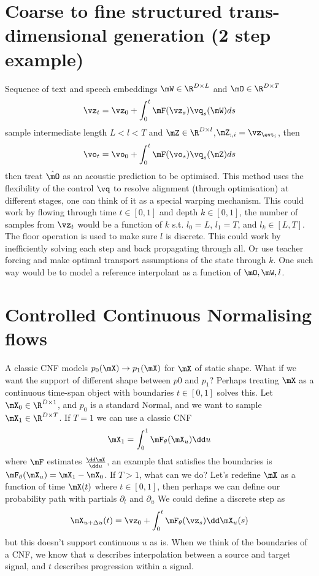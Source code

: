 \section{Coarse to fine structured trans-dimensional generation (2 step example)}
Sequence of text and speech embeddings $\mW\in\R^{D\times L}$ and $\mO\in\R^{D\times T}$
\[
\vz_t=\vz_0 + \int_0^t \mF(\vz_s)\vq_s(\mW)ds
\]
sample intermediate length $L < l < T$ and $\mZ\in\R^{D\times l}$,$\mZ_{:,i}=\vz_{\evt_i}$, then 
\[
\vo_t=\vo_0 + \int_0^t \mF(\vo_s)\vq_s(\mZ)ds
\]
then treat $\hat\mO$ as an acoustic prediction to be optimised. This method uses the flexibility of the control $\vq$ to resolve alignment (through optimisation) at different stages, one can think of it as a special warping mechanism. This could work by flowing through time $t\in[0,1]$ and depth $k\in[0,1]$, the number of samples from $\vz_t$ would be a function of $k$ s.t. $l_0=L$, $l_1=T$, and $l_k\in[L,T]$. The floor operation is used to make sure $l$ is discrete. This could work by inefficiently solving each step and back propagating through all. Or use teacher forcing and make optimal transport assumptions of the state through $k$. One such way would be to model a reference interpolant as a function of $\mO,\mW,l$. 

\section{Controlled Continuous Normalising flows}
A classic CNF models $p_0(\mX)\rightarrow p_1(\mX)$ for $\mX$ of static shape. What if we want the support of different shape between $p0$ and $p_1$? Perhaps treating $\mX$ as a continuous time-span object with boundaries $t\in[0,1]$ solves this.
Let $\mX_0\in\R^{D\times 1}$, and $p_0$ is a standard Normal, and we want to sample $\mX_1\in\R^{D\times T}$. If $T=1$ we can use a classic CNF
\[
\mX_1 = \int_0^1\mF_\theta(\mX_u)\dd u
\]
where $\mF$ estimates $\frac{\dd \mX}{\dd u}$, an example that satisfies the boundaries is $\mF_\theta(\mX_u)=\mX_1-\mX_0$. If $T>1$, what can we do? Let's redefine $\mX$ as a function of time $\mX(t)$ where $t\in[0,1]$, then perhaps we can define our probability path with partials $\partial_t$ and $\partial_u$
We could define a discrete step as
\[
\mX_{u+\Delta u}(t)=\vz_0 + \int_0^t\mF_\theta(\vz_s)\dd\mX_u(s)
\]
but this doesn't support continuous $u$ as is. When we think of the boundaries of a CNF, we know that $u$ describes interpolation between a source and target signal, and $t$ describes progression within a signal.

